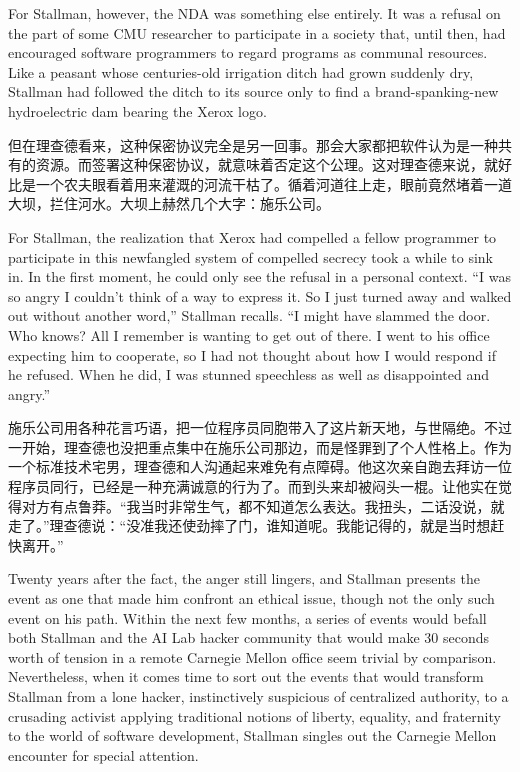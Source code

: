 \ifdefined\eng
For Stallman, however, the NDA was something else entirely. It was a refusal on the part of some CMU researcher to participate in a society that, until then, had encouraged software programmers to regard programs as communal resources. Like a peasant whose centuries-old irrigation ditch had grown suddenly dry, Stallman had followed the ditch to its source only to find a brand-spanking-new hydroelectric dam bearing the Xerox logo.
\fi

\ifdefined\chs
但在理查德看来，这种保密协议完全是另一回事。那会大家都把软件认为是一种共有的资源。而签署这种保密协议，就意味着否定这个公理。这对理查德来说，就好比是一个农夫眼看着用来灌溉的河流干枯了。循着河道往上走，眼前竟然堵着一道大坝，拦住河水。大坝上赫然几个大字：施乐公司。
\fi

\ifdefined\eng
For Stallman, the realization that Xerox had compelled a fellow programmer to participate in this newfangled system of compelled secrecy took a while to sink in. In the first moment, he could only see the refusal in a personal context. ``I was so angry I couldn't think of a way to express it. So I just turned away and walked out without another word,'' Stallman recalls. ``I might have slammed the door. Who knows? All I remember is wanting to get out of there. I went to his office expecting him to cooperate, so I had not thought about how I would respond if he refused.  When he did, I was stunned speechless as well as disappointed and angry.''
\fi

\ifdefined\chs
施乐公司用各种花言巧语，把一位程序员同胞带入了这片新天地，与世隔绝。不过一开始，理查德也没把重点集中在施乐公司那边，而是怪罪到了个人性格上。作为一个标准技术宅男，理查德和人沟通起来难免有点障碍。他这次亲自跑去拜访一位程序员同行，已经是一种充满诚意的行为了。而到头来却被闷头一棍。让他实在觉得对方有点鲁莽。“我当时非常生气，都不知道怎么表达。我扭头，二话没说，就走了。”理查德说：“没准我还使劲摔了门，谁知道呢。我能记得的，就是当时想赶快离开。”
\fi

\ifdefined\eng
Twenty years after the fact, the anger still lingers, and Stallman presents the event as one that made him confront an ethical issue, though not the only such event on his path. Within the next few months, a series of events would befall both Stallman and the AI Lab hacker community that would make 30 seconds worth of tension in a remote Carnegie Mellon office seem trivial by comparison. Nevertheless, when it comes time to sort out the events that would transform Stallman from a lone hacker, instinctively suspicious of centralized authority, to a crusading activist applying traditional notions of liberty, equality, and fraternity to the world of software development, Stallman singles out the Carnegie Mellon encounter for special attention.
\fi

